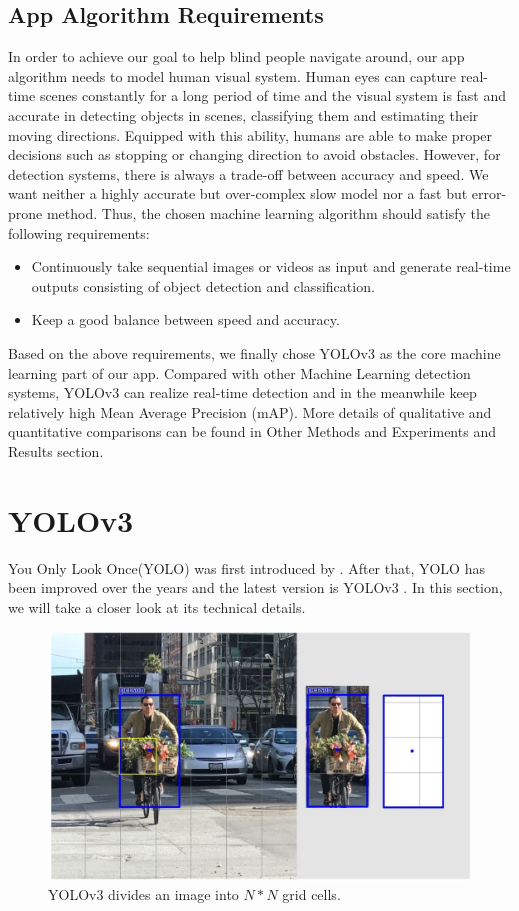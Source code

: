 \documentclass[letterpaper]{article} %
\begin{document}
\subsection{App Algorithm Requirements}
In order to achieve our goal to help blind people navigate around, our app algorithm needs to model human visual system. Human eyes can capture real-time scenes constantly for a long period of time and the visual system is fast and accurate in detecting objects in scenes, classifying them and estimating their moving directions. Equipped with this ability, humans are able to make proper decisions such as stopping or changing direction to avoid obstacles. However, for detection systems, there is always a trade-off between accuracy and speed. We want neither a highly accurate but over-complex slow model nor a fast but error-prone method. Thus, the chosen machine learning algorithm should satisfy the following requirements:
\begin{itemize}
    \item Continuously take sequential images or videos as input and generate real-time outputs consisting of object detection and classification.
    \item Keep a good balance between speed and accuracy.
\end{itemize}
Based on the above requirements, we finally chose YOLOv3 \cite{YOLOv3} as the core machine learning part of our app. Compared with other Machine Learning detection systems, YOLOv3 can realize real-time detection and in the meanwhile keep relatively high Mean Average Precision (mAP). More details of qualitative and quantitative comparisons can be found in Other Methods and Experiments and Results section.

\section{YOLOv3}
You Only Look Once(YOLO) was first introduced by \cite{YOLO}. After that, YOLO has been improved over the years and the latest version is YOLOv3 \cite{YOLOv3}. In this section, we will take a closer look at its technical details.
\begin{figure}[ht]
\hspace{-6mm}
\centering
\includegraphics[width=0.85\linewidth,height = 0.5\linewidth]{Figure/gridcells.JPG}
\caption{\footnotesize{YOLOv3 divides an image into $N*N$ grid cells.}}
\label{fig:cells}
\vspace{-3mm}
\end{figure}
\end{document}

